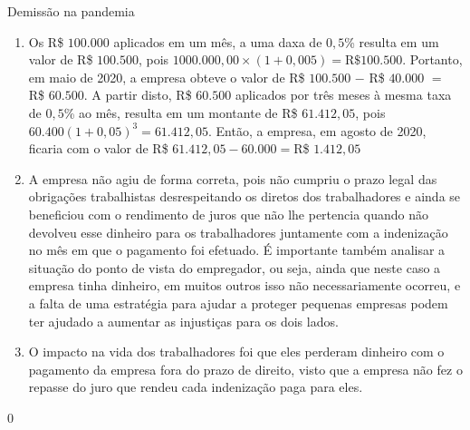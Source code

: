 \begin{answer}{Demissão na pandemia}
{
\begin{enumerate}
  \item Os R\$ $100.000$ aplicados em um mês, a uma daxa de $0{,}5$\% resulta em um valor de R\$ $100.500$, pois $1000.000{,}00\times(1+0{,}005)=\text{R\$}100.500$. Portanto, em maio de 2020, a empresa obteve o valor de R\$ $100.500$ $-$ R\$ $40.000$ $=$ R\$ $60.500$. A partir disto, R\$ $60.500$ aplicados por três meses à mesma taxa de $0{,}5$\% ao mês, resulta em um montante de R\$ $61.412{,}05$, pois $60.400(1+0{,}05)^3=61.412{,}05$. Então, a empresa, em agosto de 2020, ficaria com o valor de R\$ $61.412{,}05-60.000=$R\$ $1.412{,}05$
  \item A empresa não agiu de forma correta, pois não cumpriu o prazo legal das obrigações trabalhistas desrespeitando os diretos dos trabalhadores e ainda se beneficiou com o rendimento de juros que não lhe pertencia quando não devolveu esse dinheiro para os trabalhadores juntamente com a indenização no mês em que o pagamento foi efetuado. É importante também analisar a situação do ponto de vista do empregador, ou seja, ainda que neste caso a empresa tinha dinheiro, em muitos outros isso não necessariamente ocorreu, e a falta de uma estratégia para ajudar a proteger pequenas empresas podem ter ajudado a aumentar as injustiças para os dois lados. 
  \item O impacto na vida dos trabalhadores foi que eles perderam dinheiro com o pagamento da empresa fora do prazo de direito, visto que a empresa não fez o repasse do juro que rendeu cada indenização paga para eles.
\end{enumerate}
}{0}
\end{answer}
